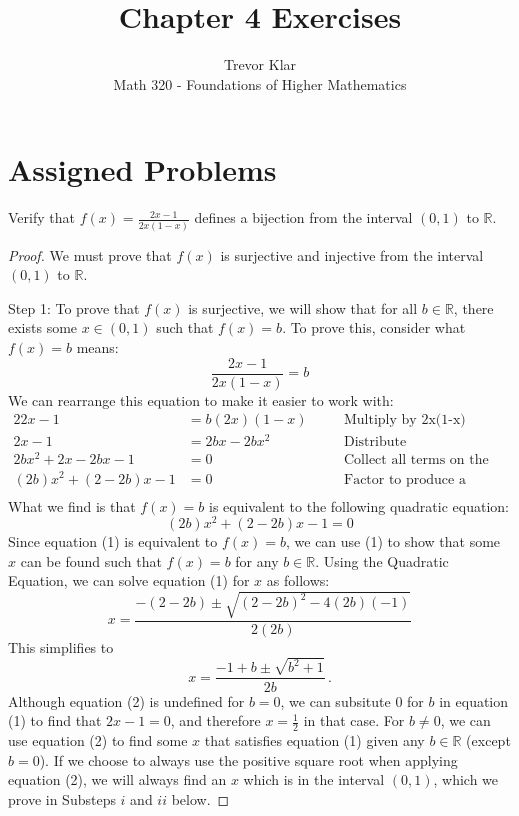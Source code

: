 \documentclass[10pt,letterpaper]{article}
\author{Trevor Klar\\
Math 320 - Foundations of Higher Mathematics}
\title{Chapter 4 Exercises}
\newcommand{\R}{\mathbb{R}}
\newenvironment{problem}[2][Problem]{\begin{trivlist}
\item[\hskip \labelsep {\bfseries #1}\hskip \labelsep {\bfseries #2.}]}{\end{trivlist}}
\begin{document}
\maketitle

\section*{Assigned Problems}

\begin{problem}{4.22}
Verify that $f(x)=\frac{2x-1}{2x(1-x)}$ defines a bijection from the interval $(0, 1)$ to $\R$.
\end{problem}

\begin{proof}
We must prove that $f(x)$ is surjective and injective from the interval $(0, 1)$ to $\R$.

Step 1: To prove that $f(x)$ is surjective, we will show that for all $b \in \R$, there exists some $x \in (0,1)$ such that $f(x) = b$.  To prove this, consider what $f(x) = b$ means:
$$\frac{2x-1}{2x(1-x)}=b$$
We can rearrange this equation to make it easier to work with:
\begin{alignat*}{2}
2x-1 					&=b(2x)(1-x) 	&\quad &\text{Multiply by 2x(1-x)}\\
2x-1 					&=2bx-2bx^2 	&\quad &\text{Distribute}\\
2bx^2 + 2x-2bx - 1 		&=0 			&\quad &\text{Collect all terms on the left}\\
(2b)x^2 + (2-2b)x - 1 	&=0 			&\quad &\text{Factor to produce a polynomial}\\
\end{alignat*} 
What we find is that $f(x)=b$ is equivalent to the following quadratic equation:
\begin{equation}
(2b)x^2 + (2-2b)x - 1 = 0
\end{equation}
Since equation (1) is equivalent to $f(x)=b$, we can use (1) to show that some $x$ can be found such that $f(x)=b$ for any $b \in \R$. Using the Quadratic Equation, we can solve equation (1) for $x$ as follows:
$$x=\frac{-(2-2b)\pm\sqrt{(2-2b)^2-4(2b)(-1)}}{2(2b)}$$
This simplifies to 
\begin{equation}
x=\frac{-1+b\pm\sqrt{b^2+1}}{2b}\,.
\end{equation}
Although equation (2) is undefined for $b=0$, we can subsitute 0 for $b$ in equation (1) to find that $2x-1=0$, and therefore $x=\frac{1}{2}$ in that case. For $b\neq0$, we can use equation (2) to find some $x$ that satisfies equation (1) given any $b \in \R$ (except $b=0$). If we choose to always use the positive square root when applying equation (2), we will always find an $x$ which is in the interval $(0,1)$, which we prove in Substeps $i$ and $ii$ below. 


\end{proof}
\end{document}
